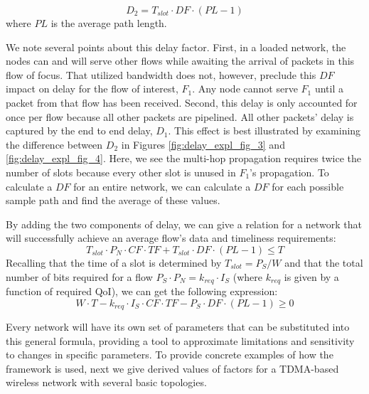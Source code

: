 \begin{equation}
	D_2 = T_{slot} \cdot DF \cdot (PL - 1)
\end{equation}
where $PL$ is the average path length.

We note several points about this delay factor.  First, in a loaded network, the nodes can and will serve other flows while awaiting the arrival of packets in this flow of focus. That utilized bandwidth does not, however, preclude this $DF$ impact on delay for the flow of interest, $F_1$.  Any node cannot serve $F_1$ until a packet from that flow has been received. Second, this delay is only accounted for once per flow because all other packets are pipelined. All other packets' delay is captured by the end to end delay, $D_1$.  This effect is best illustrated by examining the difference between $D_2$ in Figures \ref{fig:delay_expl_fig_3} and \ref{fig:delay_expl_fig_4}. Here, we see the multi-hop propagation requires twice the number of slots because every other slot is unused in $F_1$'s propagation. 
To calculate a $DF$ for an entire network, we can calculate a $DF$ for each possible sample path and find the average of these values.  %

By adding the two components of delay, we can give a relation for a network that will successfully achieve an average flow's data and timeliness requirements:
\begin{equation*}
	T_{slot} \cdot P_N \cdot CF \cdot TF + T_{slot} \cdot DF \cdot (PL-1) \leq T
\end{equation*}
Recalling that the time of a slot is determined by %
$T_{slot} = P_S/W$ %
and that the total number of bits required for a flow $P_S \cdot P_N =  k_{req} \cdot I_S$ (where $k_{req}$ is given by a function of required QoI), we can get the following expression:
\begin{equation}
	W \cdot T - k_{req} \cdot I_S \cdot CF \cdot TF - P_S \cdot DF \cdot (PL-1) \geq 0	
	\label{eq:general_scal}
\end{equation}

Every network will have its own set of parameters that can be substituted into this general formula, providing a tool to approximate limitations and sensitivity to changes in specific parameters. To provide concrete examples of how the framework is used, next we give derived values of factors for a TDMA-based wireless network with several basic topologies.




